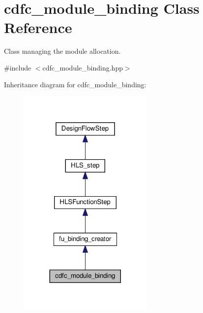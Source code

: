 \hypertarget{classcdfc__module__binding}{}\section{cdfc\+\_\+module\+\_\+binding Class Reference}
\label{classcdfc__module__binding}


Class managing the module allocation.  




{\ttfamily \#include $<$cdfc\+\_\+module\+\_\+binding.\+hpp$>$}



Inheritance diagram for cdfc\+\_\+module\+\_\+binding\+:
\nopagebreak
\begin{figure}[H]
\begin{center}
\leavevmode
\includegraphics[width=188pt]{d2/d5c/classcdfc__module__binding__inherit__graph}
\end{center}
\end{figure}


